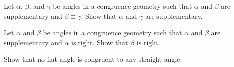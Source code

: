 \begin{exercise}
Let \(\alpha\), \(\beta\), and \(\gamma\) be angles in a congruence geometry such that \(\alpha\) and \(\beta\) are supplementary and \(\beta \equiv \gamma\).
Show that \(\alpha\) and \(\gamma\) are supplementary.
\end{exercise}

\begin{exercise}
Let \(\alpha\) and \(\beta\) be angles in a congruence geometry such that \(\alpha\) and \(\beta\) are supplementary and \(\alpha\) is right.
Show that \(\beta\) is right.
\end{exercise}

\begin{exercise}
Show that no flat angle is congruent to any straight angle.
\end{exercise}
